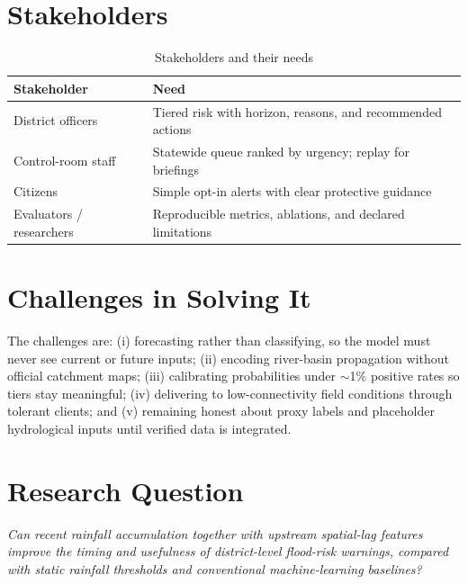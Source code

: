 \documentclass[a4paper,12pt]{report}
\begin{document}
\section{Stakeholders}
\begin{table}[H]
\centering
\renewcommand{\arraystretch}{1.3}
\begin{tabularx}{\textwidth}{|>{\raggedright\arraybackslash}p{3.6cm}|X|}
\hline
\textbf{Stakeholder} & \textbf{Need} \\ \hline
District officers & Tiered risk with horizon, reasons, and recommended actions \\ \hline
Control-room staff & Statewide queue ranked by urgency; replay for briefings \\ \hline
Citizens & Simple opt-in alerts with clear protective guidance \\ \hline
Evaluators / researchers & Reproducible metrics, ablations, and declared limitations \\ \hline
\end{tabularx}
\caption{Stakeholders and their needs}
\label{tab:stakeholders}
\end{table}

\section{Challenges in Solving It}
The challenges are: (i) forecasting rather than classifying, so the model must never see current or future inputs; (ii) encoding river-basin propagation without official catchment maps; (iii) calibrating probabilities under $\sim$1\% positive rates so tiers stay meaningful; (iv) delivering to low-connectivity field conditions through tolerant clients; and (v) remaining honest about proxy labels and placeholder hydrological inputs until verified data is integrated.

\section{Research Question}
\textit{Can recent rainfall accumulation together with upstream spatial-lag features improve the timing and usefulness of district-level flood-risk warnings, compared with static rainfall thresholds and conventional machine-learning baselines?}
\end{document}
